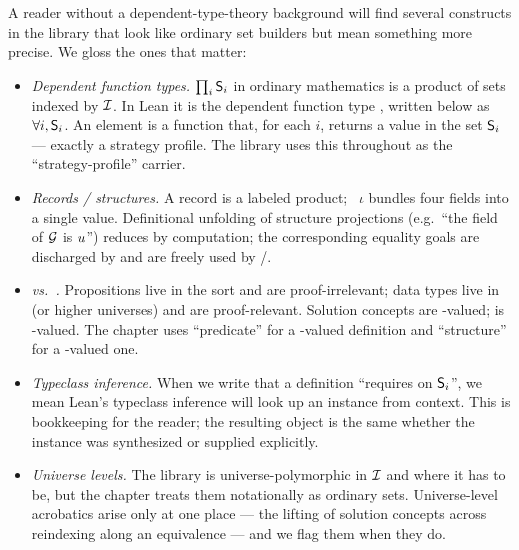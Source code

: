 A reader without a dependent-type-theory background will find
several constructs in the library that look like ordinary set
builders but mean something more precise.  We gloss the ones that
matter:

\begin{itemize}\itemsep2pt
\item \emph{Dependent function types.}  $\prod_i \mathsf{S}_i$ in
ordinary mathematics is a product of sets indexed by $\mathcal{I}$.
In Lean it is the dependent function type , written below as
$\forall i, \mathsf{S}_i$.  An element is a function that, for each
$i$, returns a value in the set $\mathsf{S}_i$ — exactly a strategy
profile.  The library uses this throughout as the
``strategy-profile'' carrier.

\item \emph{Records / structures.}  A record is a labeled product;
~$\iota$ bundles four fields into a single value.
Definitional unfolding of structure projections (e.g.\ ``the
 field of $\mathcal{G}$ is $u$'') reduces by computation; the
corresponding equality goals are discharged by  and are freely
used by /.

\item \emph{ vs.\ .}  Propositions live in the
sort  and are proof-irrelevant; data types live in
 (or higher universes) and are proof-relevant.  Solution
concepts are -valued;  is -valued.
The chapter uses ``predicate'' for a -valued definition
and ``structure'' for a -valued one.

\item \emph{Typeclass inference.}  When we write that a definition
``requires  on $\mathsf{S}_i$'', we mean Lean's typeclass
inference will look up an instance  from
context.  This is bookkeeping for the reader; the resulting object
is the same whether the instance was synthesized or supplied
explicitly.

\item \emph{Universe levels.}  The library is universe-polymorphic
in $\mathcal{I}$ and  where it has to be, but the chapter
treats them notationally as ordinary sets.  Universe-level
acrobatics arise only at one place — the lifting of solution
concepts across reindexing along an equivalence — and we flag
them when they do.
\end{itemize}

